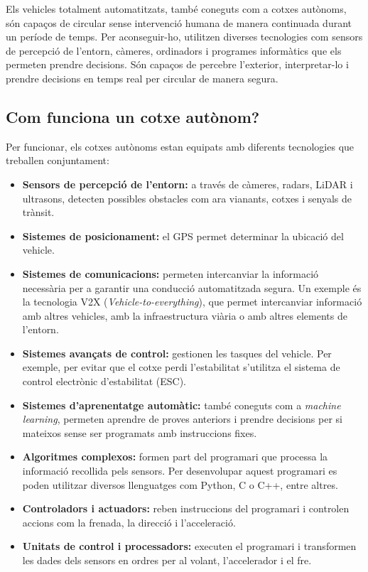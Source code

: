 \documentclass[11pt,a4paper]{article}
\begin{document}
Els vehicles totalment automatitzats, també coneguts com a cotxes autònoms, són capaços de circular sense intervenció humana de manera continuada durant un període de temps. Per aconseguir-ho, utilitzen diverses tecnologies com sensors de percepció de l’entorn, càmeres, ordinadors i programes informàtics que els permeten prendre decisions. Són capaços de percebre l’exterior, interpretar-lo i prendre decisions en temps real per circular de manera segura.

\subsection{Com funciona un cotxe autònom?}

Per funcionar, els cotxes autònoms estan equipats amb diferents tecnologies que treballen conjuntament:
\nopagebreak

\begin{itemize}
  \item \textbf{Sensors de percepció de l'entorn:} a través de càmeres, radars, LiDAR i ultrasons, detecten possibles obstacles com ara vianants, cotxes i senyals de trànsit.
  \item \textbf{Sistemes de posicionament:} el GPS permet determinar la ubicació del vehicle.
  \item \textbf{Sistemes de comunicacions:} permeten intercanviar la informació necessària per a garantir una conducció automatitzada segura. Un exemple és la tecnologia V2X (\emph{Vehicle-to-everything}), que permet intercanviar informació amb altres vehicles, amb la infraestructura viària o amb altres elements de l’entorn.
  \item \textbf{Sistemes avançats de control:} gestionen les tasques del vehicle. Per exemple, per evitar que el cotxe perdi l’estabilitat s’utilitza el sistema de control electrònic d’estabilitat (ESC).
  \item \textbf{Sistemes d’aprenentatge automàtic:} també coneguts com a \emph{machine learning}, permeten aprendre de proves anteriors i prendre decisions per si mateixos sense ser programats amb instruccions fixes.
  \item \textbf{Algoritmes complexos:} formen part del programari que processa la informació recollida pels sensors. Per desenvolupar aquest programari es poden utilitzar diversos llenguatges com Python, C o C++, entre altres.
  \item \textbf{Controladors i actuadors:} reben instruccions del programari i controlen accions com la frenada, la direcció i l’acceleració.
  \item \textbf{Unitats de control i processadors:} executen el programari i transformen les dades dels sensors en ordres per al volant, l’accelerador i el fre.
\end{itemize}
\end{document}
